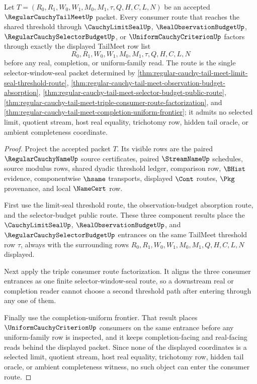 \begin{theorem}
\label{thm:regular-cauchy-tail-meet-selector-window-seal-consumer-totality}
Let $T=(R_0,R_1,W_0,W_1,M_0,M_1,\tau,Q,H,C,L,N)$ be an accepted $\RegularCauchyTailMeetUp$ packet. Every consumer route that reaches the shared threshold through $\CauchyLimitSealUp$, $\RealObservationBudgetUp$, $\RegularCauchySelectorBudgetUp$, or $\UniformCauchyCriterionUp$ factors through exactly the displayed TailMeet row list
$$
R_0,R_1,W_0,W_1,M_0,M_1,\tau,Q,H,C,L,N
$$
before any real, completion, or uniform-family read. The route is the single selector-window-seal packet determined by \autoref{thm:regular-cauchy-tail-meet-limit-seal-threshold-route}, \autoref{thm:regular-cauchy-tail-meet-observation-budget-absorption}, \autoref{thm:regular-cauchy-tail-meet-selector-budget-public-route}, \autoref{thm:regular-cauchy-tail-meet-triple-consumer-route-factorization}, and \autoref{thm:regular-cauchy-tail-meet-completion-uniform-frontier}; it admits no selected limit, quotient stream, host real equality, trichotomy row, hidden tail oracle, or ambient completeness coordinate.
\end{theorem}
\begin{proof}
Project the accepted packet $T$. Its visible rows are the paired $\RegularCauchyNameUp$ source certificates, paired $\StreamNameUp$ schedules, source modulus rows, shared dyadic threshold ledger, comparison row, $\BHist$ evidence, componentwise $\hsame$ transports, displayed $\Cont$ routes, $\Pkg$ provenance, and local $\NameCert$ row.

First use the limit-seal threshold route, the observation-budget absorption route, and the selector-budget public route. These three component results place the $\CauchyLimitSealUp$, $\RealObservationBudgetUp$, and $\RegularCauchySelectorBudgetUp$ entrances on the same TailMeet threshold row $\tau$, always with the surrounding rows $R_0,R_1,W_0,W_1,M_0,M_1,Q,H,C,L,N$ displayed.

Next apply the triple consumer route factorization. It aligns the three consumer entrances as one finite selector-window-seal route, so a downstream real or completion reader cannot choose a second threshold path after entering through any one of them.

Finally use the completion-uniform frontier. That result places $\UniformCauchyCriterionUp$ consumers on the same entrance before any uniform-family row is inspected, and it keeps completion-facing and real-facing reads behind the displayed packet. Since none of the displayed coordinates is a selected limit, quotient stream, host real equality, trichotomy row, hidden tail oracle, or ambient completeness witness, no such object can enter the consumer route.
\end{proof}
